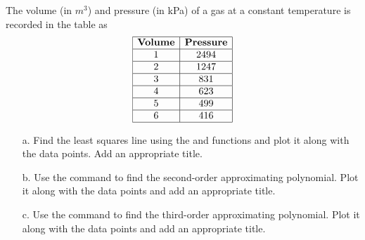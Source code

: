 {The volume (in $m^3$) and pressure (in kPa) of a gas at a constant temperature is recorded in the table as
\[
\begin{array}{|c|c|}
\hline
{\bf Volume} & {\bf Pressure} \\ \hline
1&	2494\\ \hline
2&	1247\\ \hline
3&	831\\ \hline
4&	623\\ \hline
5&	499\\ \hline
6&	416\\
\hline
\end{array}
\]
\begin{enumerate}
\item[a.] Find the least squares line using the  and  functions and plot it along with the data points. Add an appropriate title.
\item[b.] Use the  command to find the second-order approximating polynomial.  Plot it along with the data points and add an appropriate title.
\item[c.] Use the  command to find the third-order approximating polynomial.  Plot it along with the data points and add an appropriate title.
\end{enumerate}
}
{}